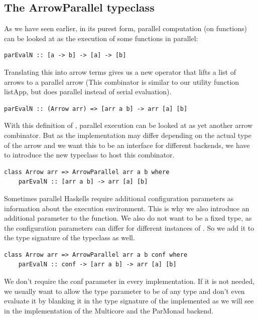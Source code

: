 \subsection{The ArrowParallel typeclass}
As we have seen earlier, in its purest form, parallel computation (on functions) can be looked at as the execution of some functions  in parallel:
\begin{lstlisting}[frame=htrbl]
parEvalN :: [a -> b] -> [a] -> [b]
\end{lstlisting}
Translating this into arrow terms gives us a new operator  that lifts a list of arrows \code{[arr a b]} to a parallel arrow  (This combinator is similar to our utility function listApp, but does parallel instead of serial evaluation).
\begin{lstlisting}[frame=htrbl]
parEvalN :: (Arrow arr) => [arr a b] -> arr [a] [b]
\end{lstlisting}
With this definition of , parallel execution can be looked at as yet another arrow combinator. But as the implementation may differ depending on the actual type of the arrow  and we want this to be an interface for different backends, we have to introduce the new typeclass  to host this combinator.
\begin{lstlisting}[frame=htrbl]
class Arrow arr => ArrowParallel arr a b where
	parEvalN :: [arr a b] -> arr [a] [b]
\end{lstlisting}
Sometimes parallel Haskells require additional configuration parameters as information about the execution environment. This is why we also introduce an additional  parameter to the function. We also do not want  to be a fixed type, as the configuration parameters can differ for different instances of . So we add it to the type signature of the typeclass as well.
\begin{lstlisting}[frame=htrbl]
class Arrow arr => ArrowParallel arr a b conf where
	parEvalN :: conf -> [arr a b] -> arr [a] [b]
\end{lstlisting}
We don't require the conf parameter in every implementation. If it is not needed, we usually want to allow the  type parameter to be of any type and don't even evaluate it by blanking it in the type signature of the implemented  as we will see in the implementation of the Multicore and the ParMonad backend.

